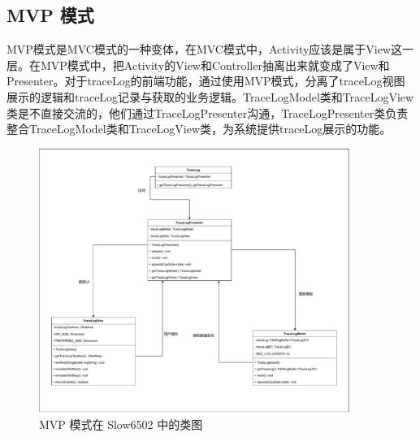 \subsection{MVP 模式}

MVP模式是MVC模式的一种变体，在MVC模式中，Activity应该是属于View这一层。在MVP模式中，把Activity的View和Controller抽离出来就变成了View和Presenter。对于traceLog的前端功能，通过使用MVP模式，分离了traceLog视图展示的逻辑和traceLog记录与获取的业务逻辑。TraceLogModel类和TraceLogView类是不直接交流的，他们通过TraceLogPresenter沟通，TraceLogPresenter类负责整合TraceLogModel类和TraceLogView类，为系统提供traceLog展示的功能。

\begin{figure}[htb]
  \centering
  \includegraphics[width=0.9\textwidth]{figures/MVP模式.pdf}
  \caption{MVP 模式在 Slow6502 中的类图}
\end{figure}


